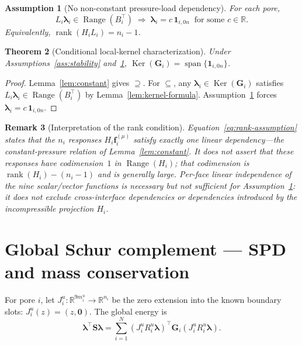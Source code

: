 \documentclass[11pt,a4paper]{article}
\newtheorem{assumption}{Assumption}[section]
\newtheorem{theorem}[assumption]{Theorem}
\newtheorem{remark}[assumption]{Remark}
\newcommand{\R}{\mathbb{R}}
\newcommand{\trac}{\bm{\lambda}}
\newcommand{\DtN}{\mathbf{G}}
\newcommand{\Schur}{\mathbf{S}}
\newcommand{\one}{\mathbf{1}}
\newcommand{\zero}{\bm{0}}
\newcommand{\loadvec}{\bm{f}}
\newcommand{\Range}{\operatorname{Range}}
\newcommand{\Ker}{\operatorname{Ker}}
\newcommand{\rank}{\operatorname{rank}}
\begin{document}
\begin{assumption}[No non-constant pressure-load dependency]\label{ass:kernel}
  For each pore,
  \begin{equation}\label{eq:rank-assumption}
    L_i\trac_i \in \Range(B_i^\top)
    \;\Longrightarrow\;
    \trac_i = c\,\one_{i,0n}\;\; \text{for some } c\in\R.
  \end{equation}
  Equivalently, $\rank(H_i L_i) = n_i - 1$.
\end{assumption}

\begin{theorem}[Conditional local-kernel characterization]\label{thm:local-kernel}
  Under Assumptions~\ref{ass:stability} and~\ref{ass:kernel},
  $\Ker(\DtN_i) = \operatorname{span}\{\one_{i,0n}\}$.
\end{theorem}

\begin{proof}
  Lemma~\ref{lem:constant} gives $\supseteq$.
  For $\subseteq$, any $\trac_i \in \Ker(\DtN_i)$ satisfies
  $L_i\trac_i \in \Range(B_i^\top)$ by Lemma~\ref{lem:kernel-formula}.
  Assumption~\ref{ass:kernel} forces $\trac_i = c\,\one_{i,0n}$.
\end{proof}

\begin{remark}[Interpretation of the rank condition]\label{rem:rank}
  Equation~\eqref{eq:rank-assumption} states that the $n_i$ responses
  $H_i\loadvec_i^{(\mu)}$ satisfy exactly one linear dependency---the
  constant-pressure relation of Lemma~\ref{lem:constant}.
  It does \emph{not} assert that these responses have codimension~$1$
  in $\Range(H_i)$; that codimension is $\rank(H_i)-(n_i-1)$ and is
  generally large.
  Per-face linear independence of the nine scalar/vector functions is
  necessary but not sufficient for Assumption~\ref{ass:kernel}: it does
  not exclude cross-interface dependencies or dependencies introduced
  by the incompressible projection $H_i$.
\end{remark}

\section{Global Schur complement --- SPD and mass conservation}

For pore $i$, let $J_i^u : \R^{9m_i^u} \to \R^{n_i}$ be the zero extension
into the known boundary slots: $J_i^u(z) = (z,\zero)$.
The global energy is
\begin{equation}\label{eq:S-energy}
  \trac^\top \Schur \trac
  = \sum_{i=1}^N (J_i^u R_i^u \trac)^\top \DtN_i (J_i^u R_i^u \trac).
\end{equation}
\end{document}
